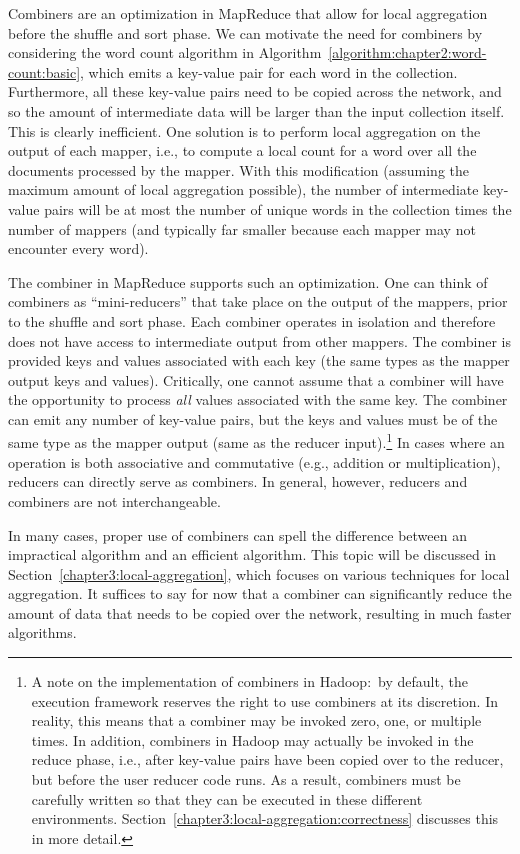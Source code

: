 \documentclass[11pt]{article}
\begin{document}
Combiners are an optimization in MapReduce that allow for local
aggregation before the shuffle and sort phase.  We can motivate the
need for combiners by considering the word count algorithm in
Algorithm~\ref{algorithm:chapter2:word-count:basic}, which emits a key-value pair
for each word in the collection.  Furthermore, all these key-value
pairs need to be copied across the network, and so the amount of
intermediate data will be larger than the input collection itself.
This is clearly inefficient.  One solution is to perform local
aggregation on the output of each mapper, i.e., to compute a local
count for a word over all the documents processed by the mapper.  With
this modification (assuming the maximum amount of local aggregation
possible), the number of intermediate key-value pairs will be at most
the number of unique words in the collection times the number of
mappers (and typically far smaller because each mapper may not
encounter every word).

The combiner in MapReduce supports such an optimization.  One can
think of combiners as ``mini-reducers'' that take place on the output
of the mappers, prior to the shuffle and sort phase.  Each combiner
operates in isolation and therefore does not have access to
intermediate output from other mappers.  The combiner is provided keys
and values associated with each key (the same types as the mapper
output keys and values).  Critically, one cannot assume that a
combiner will have the opportunity to process \emph{all} values
associated with the same key.  The combiner can emit any number of
key-value pairs, but the keys and values must be of the same type as
the mapper output (same as the reducer input).\footnote{A note on the
implementation of combiners in Hadoop:\ by default, the execution
framework reserves the right to use combiners at its discretion.  In
reality, this means that a combiner may be invoked zero, one, or
multiple times.  In addition, combiners in Hadoop may actually be
invoked in the reduce phase, i.e., after key-value pairs have been
copied over to the reducer, but before the user reducer code runs.  As
a result, combiners must be carefully written so that they can be
executed in these different environments.
Section~\ref{chapter3:local-aggregation:correctness} discusses this in
more detail.}  In cases where an operation is both associative and
commutative (e.g., addition or multiplication), reducers can directly
serve as combiners.  In general, however, reducers and combiners are
not interchangeable.

In many cases, proper use of combiners can spell the difference
between an impractical algorithm and an efficient algorithm.  This
topic will be discussed in Section~\ref{chapter3:local-aggregation},
which focuses on various techniques for local aggregation.  It
suffices to say for now that a combiner can significantly reduce the
amount of data that needs to be copied over the network, resulting in
much faster algorithms.
\end{document}
